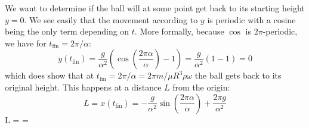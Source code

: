 We want to determine if the ball will at some point get back to its starting height $y = 0$. We see easily that the movement according to $y$ is periodic with a cosine being the only term depending on $t$. More formally, because $\cos$ is $2\pi$-periodic, we have for $t_\mathrm{fin} = 2\pi / \alpha$:
\[ y(t_\mathrm{fin}) = \frac{g}{\alpha^2}\left(\cos\left(\frac{2\pi \alpha}{\alpha}\right) - 1\right) = \frac{g}{\alpha^2}(1 - 1) = 0 \]
which does show that at $t_\mathrm{fin} = 2\pi / \alpha = 2\pi m / \mu R^3\rho\omega$ the ball gets back to its original height. This happens at a distance $L$ from the origin:
\[
    L = x(t_\mathrm{fin}) = -\frac{g}{\alpha^2}\sin\left(\frac{2\pi \alpha}{\alpha}\right) + \frac{2\pi g}{\alpha^2}
\]
\be
    L =  = 
\ee
